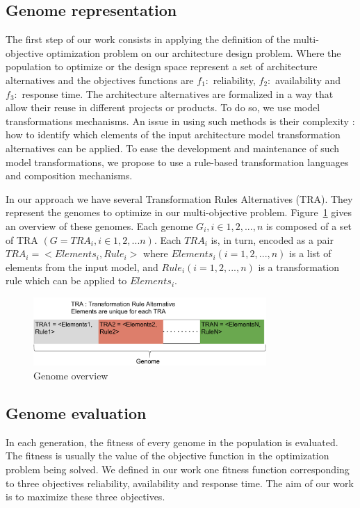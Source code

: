 \documentclass[conference]{IEEEtran}
\begin{document}
\subsection{Genome representation}
The first step of our work consists in applying the definition of the multi-objective optimization problem on our architecture design problem. Where the population to optimize or the design space represent a set of architecture alternatives and the objectives functions are $f_{1}:$ reliability, $f_{2}:$ availability and $f_{3}:$ response time. The architecture alternatives are formalized in a way that allow their reuse in different projects or products. To do so, we use model transformations mechanisms. An issue in using such methods is their complexity : how to identify which elements of the input architecture model transformation alternatives can be applied. To ease the development and maintenance of such model transformations, we propose to use a rule-based transformation languages and composition mechanisms. 

In our approach we have several Transformation Rules Alternatives (TRA). They represent the genomes to optimize in our multi-objective problem. Figure~\ref{genome} gives an overview of these genomes. Each genome $G_{i}, i \in {1,2,...,n}$ is composed of a set of TRA $(G = {TRA_{i}, i \in {1,2,...n}})$. Each $TRA_{i}$ is, in turn, encoded as a pair $TRA_{i} = <Elements_{i},Rule_{i}>$ where $Elements_{i} (i ={1,2,...,n})$ is a list of elements from the input model, and $Rule_{i} (i ={1,2,...,n})$ is a transformation rule which can be applied to $Elements_{i}$.


\begin{figure}[!t]
\centering
\includegraphics[width=3.49in]{genome.pdf}
\caption{Genome overview}
\label{genome}
\end{figure}

\subsection{Genome evaluation}
In each generation, the fitness of every genome in the population is evaluated. The fitness is usually the value of the objective function in the optimization problem being solved. We defined in our work one fitness function corresponding to three objectives reliability, availability and response time.
The aim of our work is to maximize these three objectives. 
\end{document}
